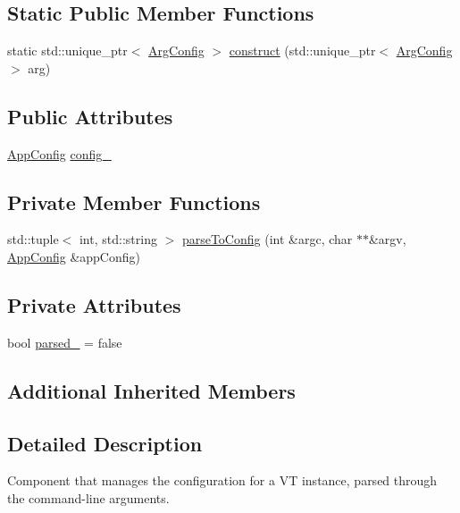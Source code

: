 \subsection*{Static Public Member Functions}
\begin{DoxyCompactItemize}
\item 
static std\+::unique\+\_\+ptr$<$ \hyperlink{structvt_1_1arguments_1_1_arg_config}{Arg\+Config} $>$ \hyperlink{structvt_1_1arguments_1_1_arg_config_a2248f3913b93ca336fdac5c2ec9c6e0b}{construct} (std\+::unique\+\_\+ptr$<$ \hyperlink{structvt_1_1arguments_1_1_arg_config}{Arg\+Config} $>$ arg)
\end{DoxyCompactItemize}
\subsection*{Public Attributes}
\begin{DoxyCompactItemize}
\item 
\hyperlink{structvt_1_1arguments_1_1_app_config}{App\+Config} \hyperlink{structvt_1_1arguments_1_1_arg_config_af30e0eae1ac1b29f7c85c25636109a9e}{config\+\_\+}
\end{DoxyCompactItemize}
\subsection*{Private Member Functions}
\begin{DoxyCompactItemize}
\item 
std\+::tuple$<$ int, std\+::string $>$ \hyperlink{structvt_1_1arguments_1_1_arg_config_a559994991752599b39a6593da9605599}{parse\+To\+Config} (int \&argc, char $\ast$$\ast$\&argv, \hyperlink{structvt_1_1arguments_1_1_app_config}{App\+Config} \&app\+Config)
\end{DoxyCompactItemize}
\subsection*{Private Attributes}
\begin{DoxyCompactItemize}
\item 
bool \hyperlink{structvt_1_1arguments_1_1_arg_config_a710f4894651d38778f924c5d5f340d96}{parsed\+\_\+} = false
\end{DoxyCompactItemize}
\subsection*{Additional Inherited Members}


\subsection{Detailed Description}
Component that manages the configuration for a VT instance, parsed through the command-\/line arguments. 

